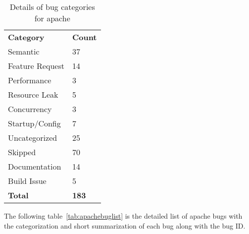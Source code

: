 \begin{table}[!h]
\centering
\caption{Details of bug categories for apache}
\label{tab:apachebugcategories}
\begin{tabular}{ll}
\textbf{Category} & \textbf{Count} \\
Semantic          & 37             \\
Feature Request   & 14             \\
Performance       & 3              \\
Resource Leak     & 5              \\
Concurrency       & 3              \\
Startup/Config    & 7              \\
Uncategorized     & 25             \\
Skipped           & 70             \\
Documentation     & 14             \\
Build Issue       & 5              \\
\textbf{Total}    & \textbf{183}  
\end{tabular}
\end{table}

The following table~\ref{tab:apachebuglist} is the detailed list of apache bugs with the categorization and short summarization of each bug along with the bug ID. 


